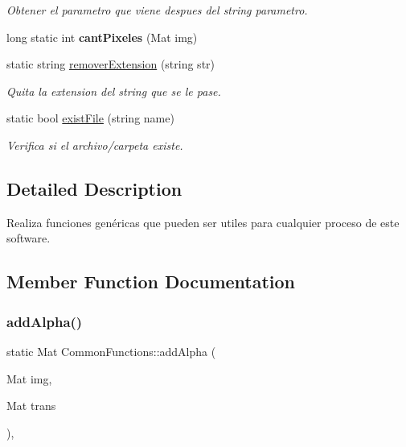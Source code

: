 \begin{DoxyCompactItemize}
\begin{DoxyCompactList}\small\item\em Obtener el parametro que viene despues del string parametro. \end{DoxyCompactList}\item 
\mbox{\label{classCommonFunctions_a96f64cedaa73dd2c2412f98beae60348}} 
long static int {\bfseries cant\+Pixeles} (Mat img)
\item 
static string \mbox{\hyperlink{classCommonFunctions_a5393a67a9e631a763fe5874174e386d0}{remover\+Extension}} (string str)
\begin{DoxyCompactList}\small\item\em Quita la extension del string que se le pase. \end{DoxyCompactList}\item 
static bool \mbox{\hyperlink{classCommonFunctions_a91521d26a009071499a413ef4535ca8a}{exist\+File}} (string name)
\begin{DoxyCompactList}\small\item\em Verifica si el archivo/carpeta existe. \end{DoxyCompactList}\end{DoxyCompactItemize}


\subsection{Detailed Description}
Realiza funciones genéricas que pueden ser utiles para cualquier proceso de este software. 

\subsection{Member Function Documentation}
\mbox{\label{classCommonFunctions_acede9b6245c18d795b94b7c2261671b1}} 
\subsubsection{\texorpdfstring{add\+Alpha()}{addAlpha()}}
{\footnotesize\ttfamily static Mat Common\+Functions\+::add\+Alpha (\begin{DoxyParamCaption}\item[{Mat}]{img,  }\item[{Mat}]{trans }\end{DoxyParamCaption})\hspace{0.3cm}{\ttfamily [inline]}, {\ttfamily [static]}}



